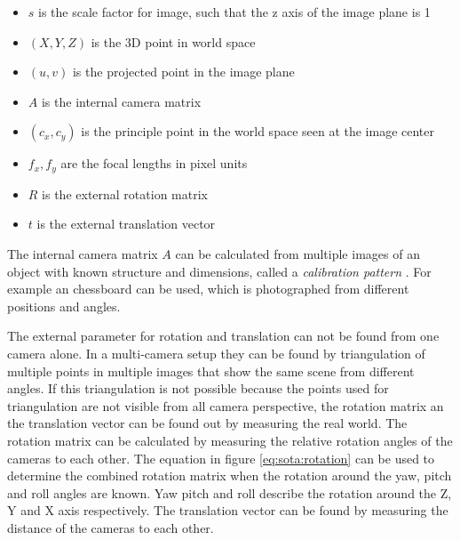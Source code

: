 \begin{samepage}
\begin{itemize}
    \item $ s $ is the scale factor for image, such that the z axis of the image plane is 1
    \item $ (X, Y, Z) $ is the 3D point in world space
    \item $ (u,v) $ is the projected point in the image plane
    \item $ A $ is the internal camera matrix
    \item $ (c_x, c_y) $ is the principle point in the world space seen at the image center
    \item $ f_x, f_y $ are the focal lengths in pixel units
    \item $ R $ is the external rotation matrix
    \item $ t $ is the external translation vector
\end{itemize}
\end{samepage}

The internal camera matrix $ A $ can be calculated from multiple images of an object with known structure and dimensions, called a \emph{calibration pattern} \textcite{opencv2018calibration}. 
For example an chessboard can be used, which is photographed from different positions and angles. 

The external parameter for rotation and translation can not be found from one camera alone.
In a multi-camera setup they can be found by triangulation of multiple points in multiple images that show the same scene from different angles.
If this triangulation is not possible because the points used for triangulation are not visible from all camera perspective, the rotation matrix an the translation vector can be found out by measuring the real world.
The rotation matrix can be calculated by measuring the relative rotation angles of the cameras to each other.
The equation in figure \ref{eq:sota:rotation} can be used to determine the combined rotation matrix when the rotation around the yaw, pitch and roll angles are known. 
Yaw pitch and roll describe the rotation around the Z, Y and X axis respectively.
The translation vector can be found by measuring the distance of the cameras to each other.

